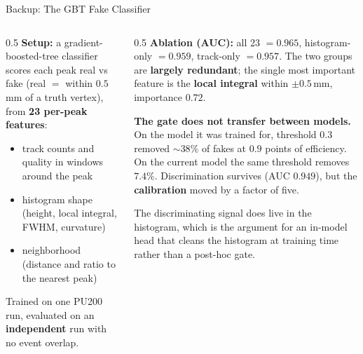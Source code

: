 \documentclass[xcolor=table,aspectratio=169]{beamer}
\begin{document}
\begin{frame}{Backup: The GBT Fake Classifier}
    \begin{columns}[c]
        \begin{column}{0.5\linewidth}
            \small
            \textbf{Setup:} a gradient-boosted-tree classifier scores each peak real vs
            fake (real $=$ within $0.5$\,mm of a truth vertex), from \textbf{23 per-peak features}:
            \begin{itemize}\setlength\itemsep{0.2em}
                \item track counts and quality in windows around the peak
                \item histogram shape (height, local integral, FWHM, curvature)
                \item neighborhood (distance and ratio to the nearest peak)
            \end{itemize}
            \vspace{0.4em}
            Trained on one PU200 run, evaluated on an \textbf{independent} run with no
            event overlap.
        \end{column}
        \begin{column}{0.5\linewidth}
            \small
            \textbf{Ablation (AUC):} all 23 $=0.965$, histogram-only $=0.959$,
            track-only $=0.957$. The two groups are \textbf{largely redundant}; the
            single most important feature is the \textbf{local integral} within
            $\pm0.5$\,mm, importance $0.72$.
            \vspace{0.5em}

            \textbf{The gate does not transfer between models.} On the model it was
            trained for, threshold $0.3$ removed ${\sim}38\%$ of fakes at $0.9$ points
            of efficiency. On the current model the same threshold removes
            \textbf{$7.4\%$}. Discrimination survives (AUC $0.949$), but the
            \textbf{calibration} moved by a factor of five.
            \vspace{0.5em}

            {\footnotesize\textcolor{black!55}{The discriminating signal does live in the
            histogram, which is the argument for an in-model head that cleans the
            histogram at training time rather than a post-hoc gate.}}
        \end{column}
    \end{columns}
\end{frame}
\end{document}
